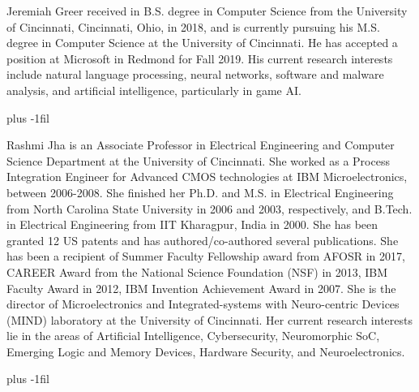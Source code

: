 % 

\newpage

\begin{IEEEbiographynophoto}{Jeremiah Greer}
received in B.S. degree in Computer Science from the University of Cincinnati, Cincinnati, Ohio, in 2018, and is currently pursuing his M.S. degree in Computer Science at the University of Cincinnati. He has accepted a position at Microsoft in Redmond for Fall 2019. His current research interests include natural language processing, neural networks, software and malware analysis, and artificial intelligence, particularly in game AI.
\end{IEEEbiographynophoto}
\vskip 0pt plus -1fil
\begin{IEEEbiographynophoto}{Rashmi Jha}
is an Associate Professor in Electrical Engineering and Computer Science Department at the University of Cincinnati. She worked as a Process Integration Engineer for Advanced CMOS technologies at IBM Microelectronics, between 2006-2008. She finished her Ph.D. and M.S. in Electrical Engineering from North Carolina State University in 2006 and 2003, respectively, and B.Tech. in Electrical Engineering from IIT Kharagpur, India in 2000. She has been granted 12 US patents and has authored/co-authored several publications. She has been a recipient of Summer Faculty Fellowship award from AFOSR in 2017, CAREER Award from the National Science Foundation (NSF) in 2013, IBM Faculty Award in 2012, IBM Invention Achievement Award in 2007. She is the director of Microelectronics and Integrated-systems with Neuro-centric Devices (MIND) laboratory at the University of Cincinnati. Her current research interests lie in the areas of Artificial Intelligence, Cybersecurity, Neuromorphic SoC, Emerging Logic and Memory Devices, Hardware Security, and Neuroelectronics.
\end{IEEEbiographynophoto}
\vskip 0pt plus -1fil

